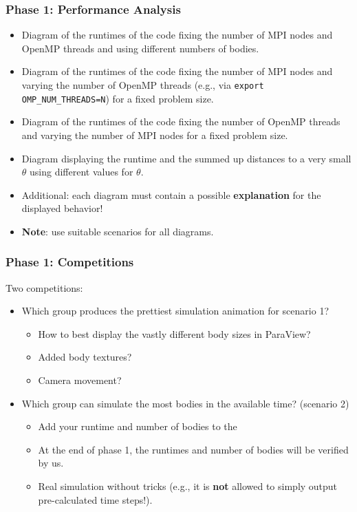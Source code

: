 \begin{frame}[fragile]
  \frametitle{Phase 1: Performance Analysis}
  \begin{itemize}
      \item Diagram of the runtimes of the code fixing the number of MPI nodes and OpenMP threads and using different numbers of bodies.
      \item Diagram of the runtimes of the code fixing the number of MPI nodes and varying the number of OpenMP threads (e.g., via \texttt{export OMP_NUM_THREADS=N}) for a fixed problem size.
      \item Diagram of the runtimes of the code fixing the number of OpenMP threads and varying the number of MPI nodes for a fixed problem size.
      \item Diagram displaying the runtime and the summed up distances to a very small $\theta$ using different values for $\theta$.
      \item Additional: each diagram must contain a possible \textbf{explanation} for the displayed behavior!
      \item \textbf{Note}: use suitable scenarios for all diagrams.
  \end{itemize}
\end{frame}

\begin{frame}[fragile]
  \frametitle{Phase 1: Competitions}
  Two competitions:
  \begin{itemize}
      \item Which group produces the prettiest simulation animation for scenario 1?
      \begin{itemize}
          \item How to best display the vastly different body sizes in ParaView?
          \item Added body textures?
          \item Camera movement?
      \end{itemize}
      \item Which group can simulate the most bodies in the available time? (scenario 2)
      \begin{itemize}
          \item Add your runtime and number of bodies to the %
          \item At the end of phase 1, the runtimes and number of bodies will be verified by us.
          \item Real simulation without tricks (e.g., it is \textbf{not} allowed to simply output pre-calculated time steps!).
      \end{itemize}
  \end{itemize}
    \vfill
\end{frame}

